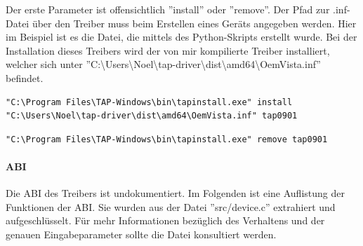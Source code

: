 {Der erste Parameter ist offensichtlich ''install'' oder ''remove''. Der Pfad zur .inf-Datei
über den Treiber muss beim Erstellen eines Geräts angegeben werden. Hier im Beispiel
ist es die Datei, die mittels des Python-Skripts erstellt wurde. Bei der Installation
dieses Treibers wird der von mir kompilierte Treiber installiert, welcher sich unter 
''C:\textbackslash{}Users\textbackslash{}Noel\textbackslash{}tap-driver\textbackslash{}dist\textbackslash{}amd64\textbackslash{}OemVista.inf''
befindet.

\begin{lstlisting}[caption=Erstellung eines TAP-Geraets]
"C:\Program Files\TAP-Windows\bin\tapinstall.exe" install "C:\Users\Noel\tap-driver\dist\amd64\OemVista.inf" tap0901
\end{lstlisting}

\begin{lstlisting}[caption=Löschung aller TAP-Geraete]
"C:\Program Files\TAP-Windows\bin\tapinstall.exe" remove tap0901
\end{lstlisting}

\paragraph{ABI}
Die \ac{ABI} des Treibers ist undokumentiert. Im Folgenden ist eine Auflistung
der Funktionen der \ac{ABI}. Sie wurden aus der Datei ''src/device.c'' extrahiert
und aufgeschlüsselt. Für mehr Informationen bezüglich des Verhaltens und der
genauen Eingabeparameter sollte die Datei konsultiert werden.

}

